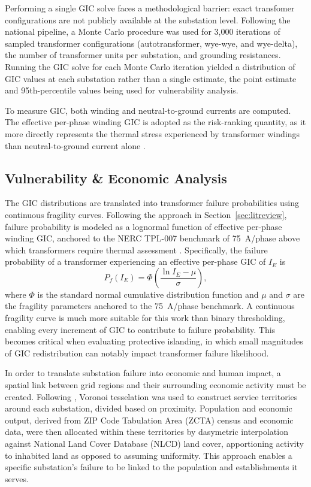 \documentclass[draft]{agujournal2019}
\begin{document}
Performing a single GIC solve faces a methodological barrier: exact transfomer configurations are not publicly available at the substation level. Following the national pipeline, a Monte Carlo procedure was used for 3,000 iterations of sampled transformer configurations (autotransformer, wye-wye, and wye-delta), the number of transformer units per substation, and grounding resistances. Running the GIC solve for each Monte Carlo iteration yielded a distribution of GIC values at each substation rather than a single estimate, the point estimate and 95th-percentile values being used for vulnerability analysis. 

To measure GIC, both winding and neutral-to-ground currents are computed. The effective per-phase winding GIC is adopted as the risk-ranking quantity, as it more directly represents the thermal stress experienced by transformer windings than neutral-to-ground current alone \cite{Klauber2020AGE}.

\subsection{Vulnerability \& Economic Analysis}

The GIC distributions are translated into transformer failure probabilities using continuous fragility curves. Following the approach in Section~\ref{sec:litreview}, failure probability is modeled as a lognormal function of effective per-phase winding GIC, anchored to the NERC TPL-007 benchmark of 75~A/phase above which transformers require thermal assessment \cite{NERC2014}. Specifically, the failure probability of a transformer experiencing an
effective per-phase GIC of $I_E$ is
\begin{equation}
P_f(I_E) = \Phi\!\left(\frac{\ln I_E - \mu}{\sigma}\right),
\label{eq:fragility}
\end{equation}
where $\Phi$ is the standard normal cumulative distribution function and
$\mu$ and $\sigma$ are the fragility parameters anchored to the 75~A/phase
benchmark. A continuous fragility curve is much more suitable for this work than binary thresholding, enabling every increment of GIC to contribute to failure probability. This becomes critical when evaluating protective islanding, in which small magnitudes of GIC redistribution can notably impact transformer failure likelihood. 


In order to translate substation failure into economic and human impact, a spatial link between grid regions and their surrounding economic activity must be created. Following , Voronoi tesselation was used to construct service territories around each substation, divided based on proximity. Population and economic output, derived from ZIP Code Tabulation Area (ZCTA) census and economic data, were then allocated within these territories by dasymetric interpolation against National Land Cover Database (NLCD) land cover, apportioning activity to inhabited land as opposed to assuming uniformity. This approach enables a specific substation's failure to be linked to the population and establishments it serves. 
\end{document}
